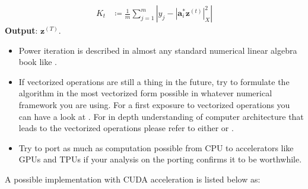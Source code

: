 {\begin{algorithm}
\begin{equation*}
\begin{split}
        K_t             &\coloneqq \frac{1}{m}\sum_{j=1}^{m}\left|y_j-\left|\boldsymbol{a}_i^*\boldsymbol{z}^{(t)}\right|_X^2\right|
      \end{split}
    \end{equation*}
    \textbf{Output}: $\boldsymbol{z}^{(T)}$.
  \end{algorithm}
  \begin{itemize}
    \item Power iteration is described in almost any standard numerical linear algebra book like \cite{Trefethen2022}\cite{Demmel1997}\cite{Golub2013}. 
    \item If vectorized operations are still a thing in the future, try to formulate the algorithm in the most vectorized form possible in whatever 
    numerical framework you are using. For a first exposure to vectorized operations you can have a look at \cite{Hager2010}. For in depth understanding of 
    computer architecture that leads to the vectorized operations please refer to either \cite{Patterson2014} or \cite{Hennessy2019}.
    \item Try to port as much as computation possible from \ac{CPU} to accelerators like \ac{GPU}s and \ac{TPU}s if 
    your analysis on the porting confirms it to be worthwhile.
  \end{itemize}
  A possible \pytorch\cite{Paszke2019} implementation with \ac{CUDA}\cite{Nvidia} acceleration is listed below as:
  \label{code:twf}    
\clearpage %
}
